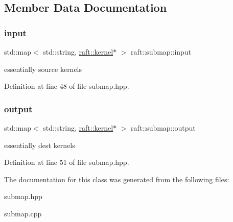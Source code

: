 \subsection{Member Data Documentation}
\hypertarget{classraft_1_1submap_ada5442c9d8489cf9bedc3f4f8aca41bb}{}\label{classraft_1_1submap_ada5442c9d8489cf9bedc3f4f8aca41bb} 
\subsubsection{\texorpdfstring{input}{input}}
{\footnotesize\ttfamily std\+::map$<$ std\+::string, \hyperlink{classraft_1_1kernel}{raft\+::kernel}$\ast$ $>$ raft\+::submap\+::input\hspace{0.3cm}{\ttfamily [protected]}}

essentially source kernels 

Definition at line 48 of file submap.\+hpp.

\hypertarget{classraft_1_1submap_a565535ee2bcd331c63e32e839ce7d1e8}{}\label{classraft_1_1submap_a565535ee2bcd331c63e32e839ce7d1e8} 
\subsubsection{\texorpdfstring{output}{output}}
{\footnotesize\ttfamily std\+::map$<$ std\+::string, \hyperlink{classraft_1_1kernel}{raft\+::kernel}$\ast$ $>$ raft\+::submap\+::output\hspace{0.3cm}{\ttfamily [protected]}}

essentially dest kernels 

Definition at line 51 of file submap.\+hpp.



The documentation for this class was generated from the following files\+:\begin{DoxyCompactItemize}
\item 
submap.\+hpp\item 
submap.\+cpp\end{DoxyCompactItemize}
